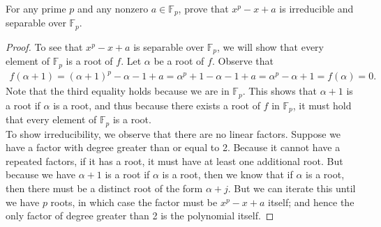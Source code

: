 \documentclass[num=9,duedate=04-07-21,course=Algebra\ II,proflastname=Walton]{hwtemplate}
\begin{document}
\problem[4]
\begin{claim}
	For any prime \(p\) and any nonzero \(a \in \mathbb{F}_p\), prove that \(x^{p}-x+a\) is irreducible and separable over \(\mathbb{F}_p\). %
\end{claim}
\begin{proof}
	To see that \(x^{p}-x+a\) is separable over \(\mathbb{F}_p\), we will show that every element of \(\mathbb{F}_p\) is a root of \(f\). Let \(\alpha \) be a root of \(f\). Observe that
	\begin{align*}
		f(\alpha +1) = (\alpha +1)^{p}-\alpha -1+a = \alpha ^{p}+1 - \alpha  - 1 + a = \alpha ^{p}-\alpha  + 1 = f(\alpha )=0.
	\end{align*}
	Note that the third equality holds because we are in \(\mathbb{F}_p\). This shows that \(\alpha +1\) is a root if \(\alpha \) is a root, and thus because there exists a root of \(f\) in \(\mathbb{F}_p\), it must hold that every element of \(\mathbb{F}_p\) is a root.\\

To show irreducibility, we observe that there are no linear factors. Suppose we have a factor with degree greater than or equal to 2. Because it cannot have a repeated factors, if it has a root, it must have at least one additional root. But because we have \(\alpha +1\) is a root if \(\alpha \) is a root, then we know that if \(\alpha \) is a root, then there must be a distinct root of the form \(\alpha +j\). But we can iterate this until we have \(p\) roots, in which case the factor must be \(x^{p}-x+a \) itself; and hence the only factor of degree greater than 2 is the polynomial itself.
\end{proof}
\end{document}
